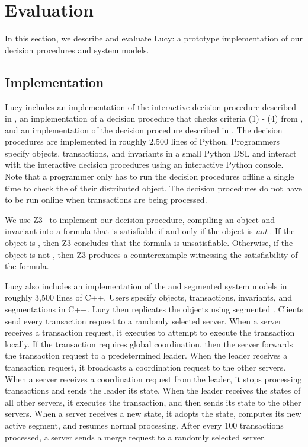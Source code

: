\section{Evaluation}
In this section, we describe and evaluate Lucy: a prototype implementation of
our decision procedures and system models.

\subsection{Implementation}
Lucy includes an implementation of the interactive decision procedure described
in , an implementation of a decision
procedure that checks criteria (1) - (4) from , and an
implementation of the decision procedure described in
. The decision procedures
are implemented in roughly 2,500 lines of Python. Programmers specify objects,
transactions, and invariants in a small Python DSL and interact with the
interactive decision procedures using an interactive Python console. Note that
a programmer only has to run the decision procedures offline a single time to
check the \invariantconfluence{} of their distributed object. The decision
procedures do not have to be run online when transactions are being processed.

We use Z3~\cite{de2008z3} to implement our \invariantclosure{} decision procedure,
compiling an object and invariant into a formula that is satisfiable if and
only if the object is \emph{not} \invariantclosed{}. If the object is
\invariantclosed{}, then Z3 concludes that the formula is unsatisfiable.
Otherwise, if the object is not \invariantclosed{}, then Z3 produces a
counterexample witnessing the satisfiability of the formula.

Lucy also includes an implementation of the \invariantconfluence{} and
segmented \invariantconfluence{} system models in roughly 3,500 lines of C++.
Users specify objects, transactions, invariants, and segmentations in C++. Lucy
then replicates the objects using segmented \invariantconfluence{}. Clients
send every transaction request to a randomly selected server. When a server
receives a transaction request, it executes  to attempt
to execute the transaction locally.  If the transaction requires global
coordination, then the server forwards the transaction request to a
predetermined leader. When the leader receives a transaction request, it
broadcasts a coordination request to the other servers. When a server receives
a coordination request from the leader, it stops processing transactions and
sends the leader its state. When the leader receives the states of all other
servers, it executes the transaction, and then sends its state to the other
servers. When a server receives a new state, it adopts the state, computes its
new active segment, and resumes normal processing. After every 100 transactions
processed, a server sends a merge request to a randomly selected server.

